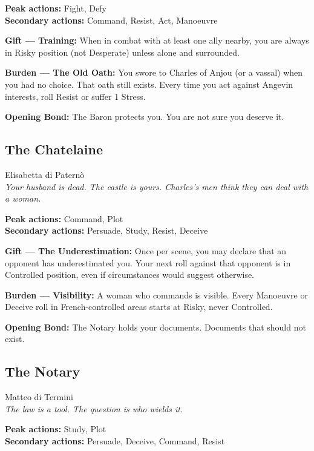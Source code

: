 \textbf{Peak actions:} Fight, Defy\\
\textbf{Secondary actions:} Command, Resist, Act, Manoeuvre

\textbf{Gift --- Training:} When in combat with at least one ally
nearby, you are always in Risky position (not Desperate) unless
alone and surrounded.

\textbf{Burden --- The Old Oath:} You swore to Charles of Anjou (or
a vassal) when you had no choice. That oath still exists. Every time
you act against Angevin interests, roll Resist or suffer 1 Stress.

\textbf{Opening Bond:} The Baron protects you.
You are not sure you deserve it.

\filetto

\subsection{The Chatelaine}
{\cinzel\footnotesize\color{grigionote} Elisabetta di Paternò}\\
\textit{Your husband is dead. The castle is yours. Charles's men think they can deal with a woman.}

\textbf{Peak actions:} Command, Plot\\
\textbf{Secondary actions:} Persuade, Study, Resist, Deceive

\textbf{Gift --- The Underestimation:} Once per scene, you may declare
that an opponent has underestimated you. Your next roll against that
opponent is in Controlled position, even if circumstances would suggest
otherwise.

\textbf{Burden --- Visibility:} A woman who commands is visible.
Every Manoeuvre or Deceive roll in French-controlled areas starts at
Risky, never Controlled.

\textbf{Opening Bond:} The Notary holds your documents.
Documents that should not exist.

\filetto

\subsection{The Notary}
{\cinzel\footnotesize\color{grigionote} Matteo di Termini}\\
\textit{The law is a tool. The question is who wields it.}

\textbf{Peak actions:} Study, Plot\\
\textbf{Secondary actions:} Persuade, Deceive, Command, Resist

